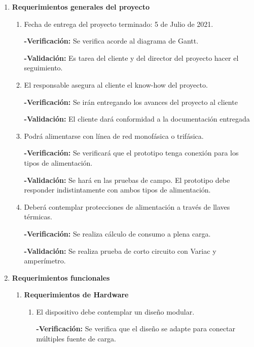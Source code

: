 \documentclass[11pt]{charter}
\begin{document}
\begin{enumerate}
	\item \textbf{Requerimientos generales del proyecto}
	\begin{enumerate}[label*=\arabic*.]
		\item Fecha de entrega del proyecto terminado: 5 de Julio de 2021.
		
		\textbf{-Verificación:} Se verifica acorde al diagrama de Gantt.
		
		\textbf{-Validación:} Es tarea del cliente y del director del proyecto hacer el seguimiento.
		
		\item El responsable asegura al cliente el know-how del proyecto.
		
		\textbf{-Verificación:} Se irán entregando los avances del proyecto al cliente
		
		\textbf{-Validación:} El cliente dará conformidad a la documentación entregada
		
		\item Podrá alimentarse con línea de red monofásica o trifásica.
		
		\textbf{-Verificación:} Se verificará que el prototipo tenga conexión para los tipos de alimentación.
		
		\textbf{-Validación:} Se hará en las pruebas de campo. El prototipo debe responder indistintamente con ambos tipos de alimentación.
		
		\item Deberá contemplar protecciones de alimentación a través de llaves térmicas.
		
		\textbf{-Verificación:} Se realiza cálculo de consumo a plena carga.
		
		\textbf{-Validación:} Se realiza prueba de corto circuito con Variac y amperímetro.
		
	\end{enumerate}

	\item \textbf{Requerimientos funcionales}
	\begin{enumerate}[label*=\arabic*.]
		\item \textbf{Requerimientos de Hardware}
			\begin{enumerate}[label*=\arabic*.]
				\item El dispositivo debe contemplar un diseño modular.
				
				\textbf{-Verificación:} Se verifica que el diseño se adapte para conectar múltiples fuente de carga.
		

\end{enumerate}
\end{enumerate}
\end{enumerate}
\end{document}
